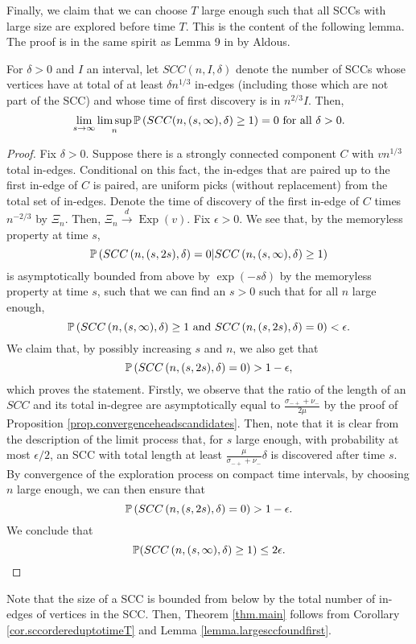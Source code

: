 Finally, we claim that we can choose $T$ large enough such that all SCCs with large size are explored before time $T$. This is the content of the following lemma. The proof is in the same spirit as Lemma 9 in \cite{Aldous1991} by Aldous. 
\begin{lemma}\label{lemma.largesccfoundfirst}
For $\delta>0$ and $I$ an interval, let $SCC(n,I,\delta)$ denote the number of SCCs whose vertices have at total of at least $\delta n^{1/3}$ in-edges (including those which are not part of the SCC) and whose time of first discovery is in $n^{2/3}I$. Then,
$$\lim_{s\to \infty}\limsup_{n} \P\left(SCC(n,(s,\infty),\delta)\geq 1\right)=0\text{ for all }\delta>0.$$
\end{lemma}
\begin{proof}
Fix $\delta>0$. Suppose there is a strongly connected component $C$ with $vn^{1/3}$ total in-edges. Conditional on this fact, the in-edges that are paired up to the first in-edge of $C$ is paired, are uniform picks (without replacement) from the total set of in-edges. Denote the time of discovery of the first in-edge of $C$ times $n^{-2/3}$ by $\Xi_n$. Then, $\Xi_n\overset{d}{\to}\operatorname{Exp}(v)$. Fix $\epsilon>0$. We see that, by the memoryless property at time $s$,
$$\P\left(SCC\left(n,(s,2s),\delta\right)=0|SCC\left(n,(s,\infty),\delta\right)\geq 1\right)$$
is asymptotically bounded from above by 
$\exp(-s\delta)$ by the memoryless property at time $s$, such that we can find an $s>0$ such that for all $n$ large enough,
$$\P\left(SCC\left(n,(s,\infty),\delta\right)\geq 1 \text{ and }SCC\left(n,(s,2s),\delta\right)=0\right)<\epsilon.$$
We claim that, by possibly increasing $s$ and $n$, we also get that 
$$\P\left(SCC\left(n,(s,2s),\delta\right)=0\right)>1-\epsilon,$$
which proves the statement.
Firstly, we observe that the ratio of the length of an $SCC$ and its total in-degree are asymptotically equal to $\frac{\sigma_{-+}+\nu_-}{2\mu}$ by the proof of Proposition \ref{prop.convergenceheadscandidates}. Then, note that it is clear from the description of the limit process that, for $s$ large enough, with probability at most $\epsilon/2$, an SCC with total length at least $\frac{\mu}{\sigma_{-+}+\nu_-}\delta$ is discovered after time $s$. By convergence of the exploration process on compact time intervals, by choosing $n$ large enough, we can then ensure that 
$$\P\left(SCC\left(n,(s,2s),\delta\right)=0\right)>1-\epsilon.$$
We conclude that 
$$\P(SCC\left(n,(s,\infty),\delta\right)\geq 1)\leq 2\epsilon.$$
\end{proof}
Note that the size of a SCC is bounded from below by the total number of in-edges of vertices in the SCC. Then, Theorem \ref{thm.main} follows from Corollary \ref{cor.sccordereduptotimeT} and Lemma \ref{lemma.largesccfoundfirst}. 

